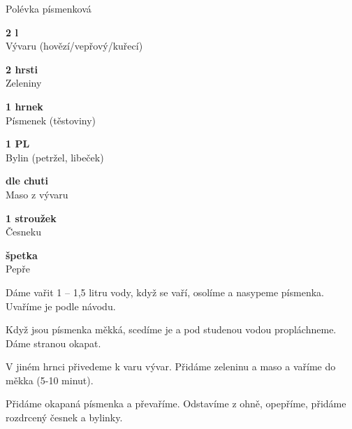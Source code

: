 \documentclass[11pt,a4paper]{article}
\begin{document}
\begin{recipe}[ForestGreen]{Polévka písmenková}
    \begin{ingredients}
        \item \parbox[t]{\linewidth}{\raggedright \liquid \textbf{2 l}\\ Vývaru (hovězí/vepřový/kuřecí)}
        \item \parbox[t]{\linewidth}{\raggedright \indefinite \textbf{2 hrsti}\\ Zeleniny}
        \item \parbox[t]{\linewidth}{\raggedright \piece \textbf{1 hrnek}\\ Písmenek (těstoviny)}
        \item \parbox[t]{\linewidth}{\raggedright \spoon \textbf{1 PL}\\ Bylin (petržel, libeček)}
        \item \parbox[t]{\linewidth}{\raggedright \weight \textbf{dle chuti}\\ Maso z vývaru}
        \item \parbox[t]{\linewidth}{\raggedright \piece \textbf{1 stroužek}\\ Česneku}
        \item \parbox[t]{\linewidth}{\raggedright \indefinite \textbf{špetka}\\ Pepře}
    \end{ingredients}
    \begin{steps}
        \item Dáme vařit 1 – 1,5 litru vody, když se vaří, osolíme a nasypeme písmenka. Uvaříme je podle návodu. 
        \item Když jsou písmenka měkká, scedíme je a pod studenou vodou propláchneme. Dáme stranou okapat. 
        \item V jiném hrnci přivedeme k varu vývar. Přidáme zeleninu a maso a vaříme do měkka (5-10 minut). 
        \item Přidáme okapaná písmenka a převaříme. Odstavíme z ohně, opepříme, přidáme rozdrcený česnek a bylinky.
    \end{steps}
\end{recipe}
\end{document}
